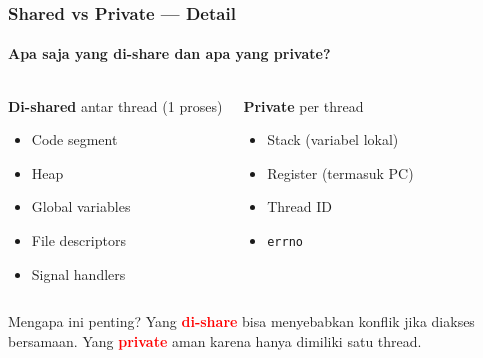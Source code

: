 \documentclass[t,aspectratio=169,xcolor=dvipsnames]{beamer}
\newcommand{\tem}[1]{\textbf{\textcolor{red}{#1}}}
\begin{document}
\begin{frame}
    \frametitle{Shared vs Private — Detail}
    \framesubtitle{Apa saja yang di-share dan apa yang private?}
    \small

    \begin{columns}[T]
        \begin{block}{\textbf{Di-shared} antar thread (1 proses)}
            \begin{itemize}
                \item Code segment
                \item Heap
                \item Global variables
                \item File descriptors
                \item Signal handlers
            \end{itemize}
        \end{block}

        \begin{alertblock}{\textbf{Private} per thread}
            \begin{itemize}
                \item Stack (variabel lokal)
                \item Register (termasuk PC)
                \item Thread ID
                \item \texttt{errno}
            \end{itemize}
        \end{alertblock}
    \end{columns}

    \vspace{0.3cm}
    \begin{exampleblock}{Mengapa ini penting?}
        Yang \tem{di-share} bisa menyebabkan konflik jika diakses bersamaan. Yang \tem{private} aman karena hanya dimiliki satu thread.
    \end{exampleblock}
\end{frame}
\end{document}
